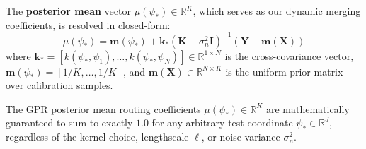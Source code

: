 The \textbf{posterior mean} vector $\mu(\psi_*) \in \mathbb{R}^K$, which serves as our dynamic merging coefficients, is resolved in closed-form:
\begin{equation}
\mu(\psi_*) = \mathbf{m}(\psi_*) + \mathbf{k}_* \left( \mathbf{K} + \sigma_n^2 \mathbf{I} \right)^{-1} \left( \mathbf{Y} - \mathbf{m}(\mathbf{X}) \right)
\label{eq:post_mean}
\end{equation}
where $\mathbf{k}_* = [k(\psi_*, \psi_1), \dots, k(\psi_*, \psi_N)] \in \mathbb{R}^{1 \times N}$ is the cross-covariance vector, $\mathbf{m}(\psi_*) = [1/K, \dots, 1/K]$, and $\mathbf{m}(\mathbf{X}) \in \mathbb{R}^{N \times K}$ is the uniform prior matrix over calibration samples.

\begin{proposition}
The GPR posterior mean routing coefficients $\mu(\psi_*) \in \mathbb{R}^K$ are mathematically guaranteed to sum to exactly $1.0$ for any arbitrary test coordinate $\psi_* \in \mathbb{R}^d$, regardless of the kernel choice, lengthscale $\ell$, or noise variance $\sigma_n^2$.
\end{proposition}
